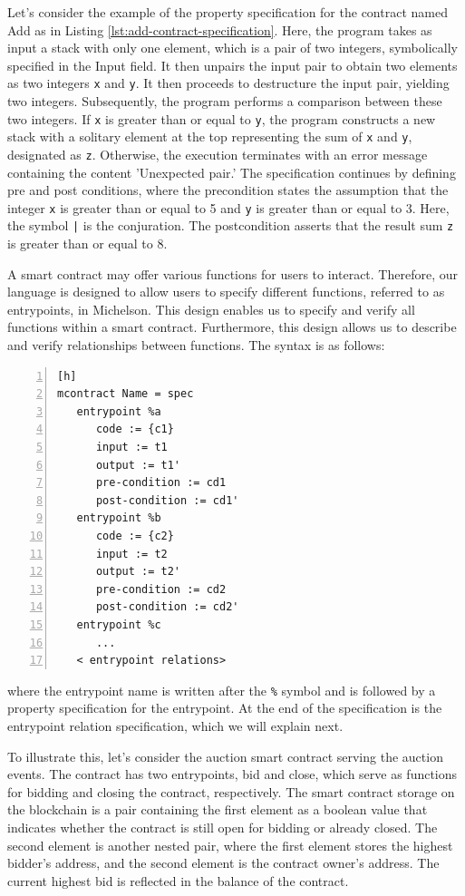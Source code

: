 \documentclass[a4paper,UKenglish,cleveref, autoref, thm-restate]{lipics-v2021}
\begin{document}
Let's consider the  example of the property specification for the contract named Add as in Listing \ref{lst:add-contract-specification}. Here, the program takes as input a stack with only one element, which is a pair of two integers, symbolically specified in the Input field. It then unpairs the input pair to obtain two elements as two integers \lstinline/x/ and \lstinline/y/.  It then proceeds to destructure the input pair, yielding two integers. Subsequently, the program performs a comparison between these two integers. If  \lstinline/x/ is greater than or equal to \lstinline/y/, the program constructs a new stack with a solitary element at the top representing the sum of  \lstinline/x/ and \lstinline/y/, designated as \lstinline/z/. Otherwise, the execution terminates with an error message containing the content 'Unexpected pair.' The specification continues by defining pre and post conditions, where the precondition states the assumption that the integer  \lstinline/x/ is greater than or equal to 5 and \lstinline/y/ is greater than or equal to 3. Here, the symbol  \lstinline/|/ is the conjuration. The postcondition asserts that the result sum \lstinline/z/ is greater than or equal to 8. 

A smart contract may offer various functions for users to interact. Therefore, our language is designed to allow users to specify different functions, referred to as entrypoints, in Michelson. This design enables us to specify and verify all functions within a smart contract. Furthermore, this design allows us to describe and verify relationships between functions.  The syntax is as follows: 
\begin{lstlisting}[float,captionpos=b,caption={Multiple entrypoint specification syntax},label={lst:safer-contract-module},numbers=left][h]
mcontract Name = spec
   entrypoint %a 
      code := {c1}
      input := t1
      output := t1'
      pre-condition := cd1
      post-condition := cd1'
   entrypoint %b 
      code := {c2}
      input := t2
      output := t2'
      pre-condition := cd2
      post-condition := cd2'
   entrypoint %c 
      ...
   < entrypoint relations>
\end{lstlisting}
where the entrypoint name is written after the \lstinline/%/ symbol and is followed by a property specification for the entrypoint. At the end of the specification is the entrypoint relation specification, which we will explain next.

To illustrate this, let's consider the  auction smart contract serving the auction events. The contract has two entrypoints, bid and close, which serve as functions for bidding and closing the contract, respectively. The smart contract storage on the blockchain is a pair containing the first element as a boolean value that indicates whether the contract is still open for bidding or already closed. The second element is another nested pair, where the first element  stores the highest bidder's address, and the second element is the contract owner's address. The current highest bid is reflected in the balance of the contract.
\end{document}
